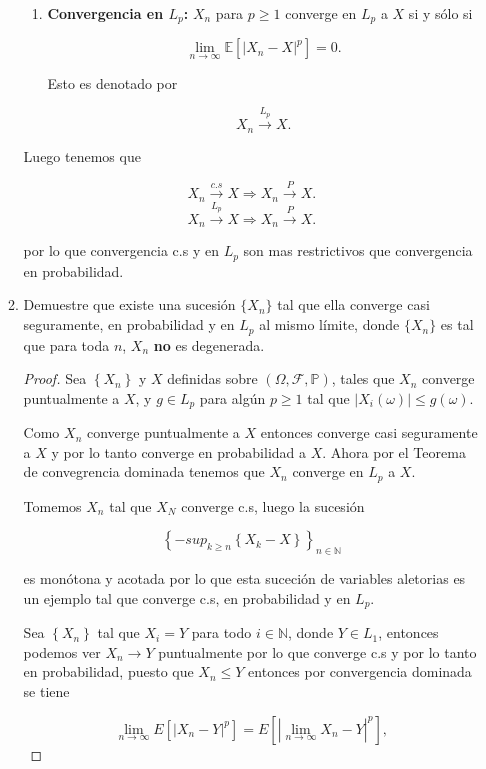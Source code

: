 \documentclass[letterpaper]{article}
\theoremstyle{definition}
\theoremstyle{lemathm}
\theoremstyle{lemademthm}
\newcommand{\limninf}{\lim_{n\to\infty}}
\newcommand{\abs}[1]{\left| #1 \right| }
\newcommand{\bracs}[1]{\left[ #1 \right] }
\newcommand{\set}[1]{\left \{ #1 \right\} }
\newcommand{\N}{\mathbb{N}}
\newcommand{\1}{\mathbbm{1}}
\begin{document}
\begin{enumerate}
\begin{enumerate}
\begin{enumerate}
				\item \textbf{Convergencia en $L_p$:} $X_n$ para $p\geq 1$ converge en $L_p$ a $X$ si y sólo si
				
				\[\limninf \mathbb{E}\bracs{\abs{X_n-X}^p} = 0.\]

				Esto es denotado por
				
				\[X_n \xrightarrow{L_p} X.\]



			\end{enumerate}

			Luego tenemos que

			\[X_n \xrightarrow{c.s} X \Rightarrow X_n \xrightarrow{P} X.\]
			\[X_n \xrightarrow{L_p} X \Rightarrow X_n \xrightarrow{P} X.\]

			por lo que convergencia c.s y en $L_p$ son mas restrictivos que convergencia en probabilidad.

			\newpage


			\item Demuestre que existe una sucesión $\{X_n\}$ tal que ella converge casi seguramente, en probabilidad y en $L_p$ al mismo límite, donde $\{X_n\}$ es tal que para toda $n$, $X_n$ \textbf{no} es degenerada.
			
			\begin{proof}
				Sea $\set{X_n}$ y $X$ definidas sobre $(\Omega, \mathcal{F}, \mathbb{P})$, tales que $X_n$ converge puntualmente a $X$, y $g \in L_p$ para algún $p\geq 1$ tal que $\abs{X_i(\omega)} \leq g(\omega)$.

				Como $X_n$ converge puntualmente a $X$ entonces converge casi seguramente a $X$ y por lo tanto converge en probabilidad a $X$. Ahora por el Teorema de convegrencia dominada tenemos que $X_n$ converge en $L_p$ a $X$.

				Tomemos $X_n$ tal que $X_N$ converge c.s, luego la sucesión

				\[\set{-sup_{k\geq n}\set{X_k - X}}_{n \in \N}\]

				es monótona y acotada por lo que esta suceción de variables aletorias es un ejemplo tal que converge c.s, en probabilidad y en $L_p$.

				Sea $\set{X_n}$ tal que $X_i = Y$ para todo $i\in\N$, donde $Y \in L_1$, entonces podemos ver $X_n\rightarrow Y$ puntualmente por lo que converge c.s y por lo tanto en probabilidad, puesto que $X_n \leq Y$ entonces por convergencia dominada se tiene

				\[\limninf E[|X_n-Y|^p] = E[|\limninf X_n-Y|^p],\]
				

\end{proof}
\end{enumerate}
\end{enumerate}
\end{document}
